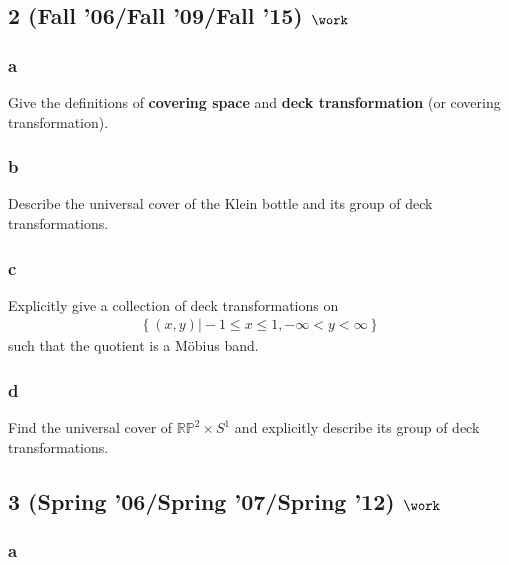 \hypertarget{fall-06fall-09fall-15-work}{%
\subsection{\texorpdfstring{2 (Fall '06/Fall '09/Fall '15)
\(\work\)}{2 (Fall '06/Fall '09/Fall '15) \textbackslash work}}\label{fall-06fall-09fall-15-work}}

\hypertarget{a-14}{%
\subsubsection{a}\label{a-14}}

Give the definitions of \textbf{covering space} and \textbf{deck
transformation} (or covering transformation).

\hypertarget{b-14}{%
\subsubsection{b}\label{b-14}}

Describe the universal cover of the Klein bottle and its group of deck
transformations.

\hypertarget{c-3}{%
\subsubsection{c}\label{c-3}}

Explicitly give a collection of deck transformations on
\begin{align*}\left\{{(x, y) \mathrel{\Big|}-1 \leq x \leq 1, -\infty < y < \infty}\right\}\end{align*}
such that the quotient is a Möbius band.

\hypertarget{d}{%
\subsubsection{d}\label{d}}

Find the universal cover of \({\mathbb{RP}}^2 \times S^1\) and
explicitly describe its group of deck transformations.

\hypertarget{spring-06spring-07spring-12-work}{%
\subsection{\texorpdfstring{3 (Spring '06/Spring '07/Spring '12)
\(\work\)}{3 (Spring '06/Spring '07/Spring '12) \textbackslash work}}\label{spring-06spring-07spring-12-work}}

\hypertarget{a-15}{%
\subsubsection{a}\label{a-15}}

